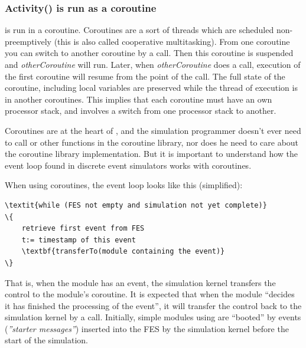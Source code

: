 \subsubsection{Activity() is run as a coroutine}


 is run in a coroutine.
Coroutines are a sort of threads which are scheduled
non-preemptively (this is also called cooperative
multitasking). From one coroutine you
can switch to another coroutine by a
 call. Then this
coroutine is suspended and \textit{otherCoroutine} will run. Later,
when \textit{otherCoroutine} does a
 call, execution of
the first coroutine will resume from the point of the
 call.  The full state
of the coroutine, including local variables are preserved while the
thread of execution is in another coroutines.  This implies that each
coroutine must have an own processor stack, and
 involves a switch from one processor stack to
another.


Coroutines are at the heart of {\opp}, and the
simulation programmer doesn't ever need to call 
or other functions in the coroutine library, nor does he need to care
about the coroutine library implementation. But it is important to
understand how the event loop found in discrete event simulators works
with coroutines.


When using coroutines, the event loop looks like
this (simplified):


\begin{Verbatim}[commandchars=\\\{\}]
\textit{while (FES not empty and simulation not yet complete)}
\{
    retrieve first event from FES
    t:= timestamp of this event
    \textbf{transferTo(module containing the event)}
\}
\end{Verbatim}



That is, when the module has an event, the simulation
kernel transfers the control to the module's coroutine. It is expected
that when the module ``decides it has finished the processing of the
event'', it will transfer the control back to the simulation kernel by
a  call. Initially,
simple modules using  are
``booted'' by events (\textit{''starter messages''})
inserted into the FES by the simulation kernel before the
start of the simulation.


